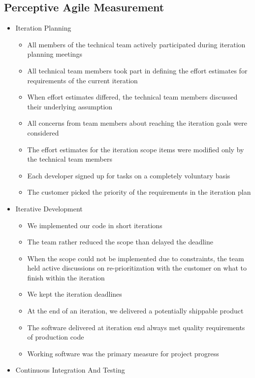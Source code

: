 \begin{appendices}
\chapter{Perceptive Agile Measurement}
\label{sec:pam}

\begin{itemize}
	\item Iteration Planning
		\begin{itemize}
			\item All members of the technical team actively participated during iteration planning meetings
			\item All technical team members took part in defining the effort estimates for requirements of the current iteration
   			\item When effort estimates differed, the technical team members discussed their underlying assumption
   			\item All concerns from team members about reaching the iteration goals were considered
   			\item The effort estimates for the iteration scope items were modified only by the technical team members
   			\item Each developer signed up for tasks on a completely voluntary basis
   			\item The customer picked the priority of the requirements in the iteration plan
		\end{itemize}
	\item Iterative Development
		\begin{itemize}
			\item We implemented our code in short iterations
			\item The team rather reduced the scope than delayed the deadline
			\item When the scope could not be implemented due to constraints, the team held active discussions on re-prioritization with the customer on what to finish within the iteration
			\item We kept the iteration deadlines
			\item At the end of an iteration, we delivered a potentially shippable product
			\item The software delivered at iteration end always met quality requirements of production code
			\item Working software was the primary measure for project progress
		\end{itemize}
	\item Continuous Integration And Testing

\end{itemize}
\end{appendices}

